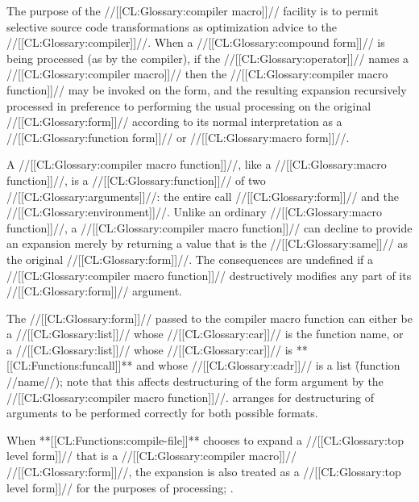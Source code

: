 

The purpose of the //[[CL:Glossary:compiler macro]]// facility is to permit 
selective source code transformations as optimization advice 
to the //[[CL:Glossary:compiler]]//.  When a //[[CL:Glossary:compound form]]// is being
processed (as by the compiler), if the //[[CL:Glossary:operator]]// names a
//[[CL:Glossary:compiler macro]]// then the //[[CL:Glossary:compiler macro function]]// may be
invoked on the form, and the resulting expansion recursively processed
in preference to performing the usual processing on the original //[[CL:Glossary:form]]//
according to its normal interpretation as a //[[CL:Glossary:function form]]// or
//[[CL:Glossary:macro form]]//.
 
A //[[CL:Glossary:compiler macro function]]//, like a //[[CL:Glossary:macro function]]//,
is a //[[CL:Glossary:function]]// of two //[[CL:Glossary:arguments]]//: the entire call //[[CL:Glossary:form]]//
and the //[[CL:Glossary:environment]]//. Unlike an ordinary //[[CL:Glossary:macro function]]//, a 
//[[CL:Glossary:compiler macro function]]// can decline to provide an expansion merely by
returning a value that is the //[[CL:Glossary:same]]// as the original //[[CL:Glossary:form]]//.
The consequences are undefined if a //[[CL:Glossary:compiler macro function]]//
destructively modifies any part of its //[[CL:Glossary:form]]// argument.
 
The //[[CL:Glossary:form]]// passed to the compiler macro function can either be a //[[CL:Glossary:list]]//
whose //[[CL:Glossary:car]]// is the function name, or a //[[CL:Glossary:list]]// whose //[[CL:Glossary:car]]// is
**[[CL:Functions:funcall]]** and whose //[[CL:Glossary:cadr]]// is a list \f{(function //name//)};
note that this affects destructuring of the form argument by the 
//[[CL:Glossary:compiler macro function]]//.
 arranges for destructuring of arguments to be
performed correctly for both possible formats.





When **[[CL:Functions:compile-file]]** chooses to expand a //[[CL:Glossary:top level form]]// that is
a //[[CL:Glossary:compiler macro]]// //[[CL:Glossary:form]]//, the expansion is also treated as a //[[CL:Glossary:top level form]]//
for the purposes of  processing; \seesection\TopLevelForms.



